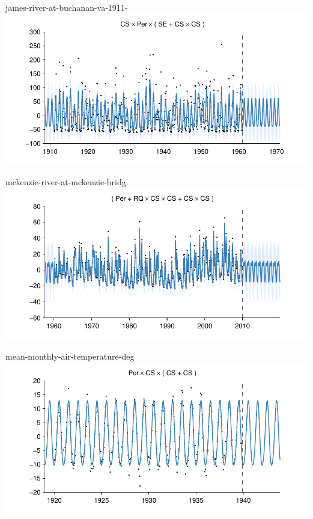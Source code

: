     
\begin{frame}{james-river-at-buchanan-va-1911-}
  \center
  \includegraphics[width=1.0\textwidth]{figures/james-river-at-buchanan-va-1911-/james-river-at-buchanan-va-1911-_all}
\end{frame}  


    
\begin{frame}{mckenzie-river-at-mckenzie-bridg}
  \center
  \includegraphics[width=1.0\textwidth]{figures/mckenzie-river-at-mckenzie-bridg/mckenzie-river-at-mckenzie-bridg_all}
\end{frame}  


    
\begin{frame}{mean-monthly-air-temperature-deg}
  \center
  \includegraphics[width=1.0\textwidth]{figures/mean-monthly-air-temperature-deg/mean-monthly-air-temperature-deg_all}
\end{frame}  



